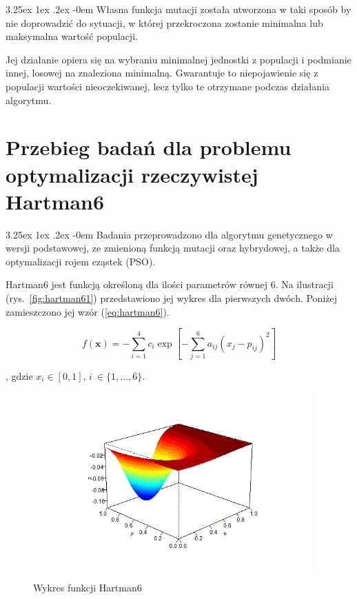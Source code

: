 \documentclass[11pt, a4paper]{article}
\makeatletter
\newcommand{\fbi}{\leavevmode{\parindent=1em\indent}}
\renewcommand\paragraph{\@startsection{paragraph}{5}{\z@}
  {3.25ex \@plus1ex \@minus.2ex}
  {-0em}
  {\normalfont\normalsize\bfseries}}
\makeatother
\begin{document}
\paragraph{}
Własna funkcja mutacji została utworzona w taki sposób by nie doprowadzić do sytuacji, w której przekroczona zostanie minimalna lub maksymalna wartość populacji. 

\fbi
Jej działanie opiera się na wybraniu minimalnej jednostki z populacji i podmianie innej, losowej na znaleziona minimalną. Gwarantuje to niepojawienie się z populacji wartości nieoczekiwanej, lecz tylko te otrzymane podczas działania algorytmu.


\newpage
\section{Przebieg badań dla problemu optymalizacji rzeczywistej Hartman6}
\paragraph{}
Badania przeprowadzono dla algorytmu genetycznego w wersji podstawowej, ze zmienioną funkcją mutacji oraz hybrydowej, a także dla optymalizacji rojem cząstek (PSO).

\fbi
Hartman6 jest funkcją określoną dla ilości parametrów równej 6. Na ilustracji (rys.~\ref{fig:hartman61}) przedstawiono jej wykres dla pierwszych dwóch. Poniżej zamieszczono jej wzór (\ref{eq:hartman6}).

\begin{equation}\label{eq:hartman6}
f(\boldsymbol{x}) = - \sum_{i=1}^{4} c_i \exp[- \sum_{j=1}^{6} a_{ij}(x_j - p_{ij})^2]
\end{equation}

, gdzie $ x_i \in [0, 1] $, $ i~\in \{1, ..., 6\} $.


\begin{figure}[H]
	\centering
	\includegraphics[width=0.95\textwidth]{./assets/Hartman6_overview.png}
	\caption{Wykres funkcji Hartman6}
	\label{fig:Hartman6_overview}
\end{figure}
\end{document}
